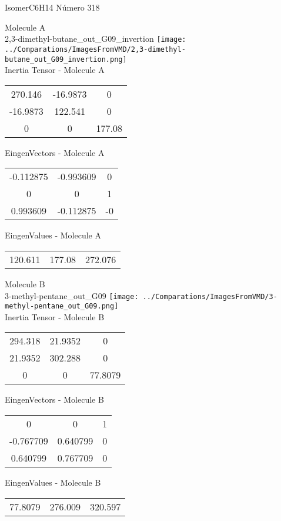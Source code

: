 \vtab[-2cm]
\begin{center}
{\large IsomerC6H14 \tab Número 318}
\end{center}
\begin{multicols}{2}
\begin{center}

Molecule A \\ 
2,3-dimethyl-butane\_out\_G09\_invertion
\texttt{[image: ../Comparations/ImagesFromVMD/2,3-dimethyl-butane\_out\_G09\_invertion.png]}
\\
Inertia Tensor - Molecule A \\
\vtab

\begin{tabular}{|c c c|}
270.146	 & 	-16.9873	 & 	0	 \\
-16.9873	 & 	122.541	 & 	0	 \\
0	 & 	0	 & 	177.08
\end{tabular}

\vtab
 EingenVectors - Molecule A     \\
\vtab
\begin{tabular}{|c c c|}
-0.112875	 & 	-0.993609	 & 	0	 \\
0	 & 	0	 & 	1	 \\
0.993609	 & 	-0.112875	 & 	-0
\end{tabular}

\vtab
 EingenValues - Molecule A     \\
\vtab
\begin{tabular}{|c c c|}
120.611	 & 	177.08	 & 	272.076	 \\
\end{tabular}
\columnbreak

Molecule B \\ 
3-methyl-pentane\_out\_G09
\texttt{[image: ../Comparations/ImagesFromVMD/3-methyl-pentane\_out\_G09.png]}
\\
Inertia Tensor - Molecule B \\
\vtab

\begin{tabular}{|c c c|}
294.318	 & 	21.9352	 & 	0	 \\
21.9352	 & 	302.288	 & 	0	 \\
0	 & 	0	 & 	77.8079
\end{tabular}

\vtab
 EingenVectors - Molecule B     \\
\vtab
\begin{tabular}{|c c c|}
0	 & 	0	 & 	1	 \\
-0.767709	 & 	0.640799	 & 	0	 \\
0.640799	 & 	0.767709	 & 	0
\end{tabular}

\vtab
 EingenValues - Molecule B     \\
\vtab
\begin{tabular}{|c c c|}
77.8079	 & 	276.009	 & 	320.597	 \\
\end{tabular}

\end{center}
\end{multicols}
